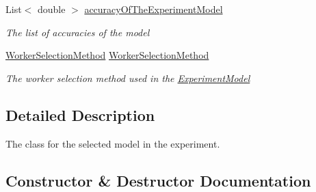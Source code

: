 \begin{DoxyCompactItemize}
List$<$ double $>$ \hyperlink{class_acrive_crowd_g_u_i_1_1_experiment_model_ada76d7308ef6cea72a9e330dbb8609d7}{accuracy\+Of\+The\+Experiment\+Model}
\begin{DoxyCompactList}\small\item\em The list of accuracies of the model \end{DoxyCompactList}\item 
\hyperlink{namespace_crowdsourcing_models_a1f0e849dc0691caa8fda0ce7778756a6}{Worker\+Selection\+Method} \hyperlink{class_acrive_crowd_g_u_i_1_1_experiment_model_ac16067088de0e358eca610efad0fba17}{Worker\+Selection\+Method}
\begin{DoxyCompactList}\small\item\em The worker selection method used in the \hyperlink{class_acrive_crowd_g_u_i_1_1_experiment_model}{Experiment\+Model} \end{DoxyCompactList}\end{DoxyCompactItemize}


\subsection{Detailed Description}
The class for the selected model in the experiment. 



\subsection{Constructor \& Destructor Documentation}
\hypertarget{class_acrive_crowd_g_u_i_1_1_experiment_model_a6a123911e50acef2040b3769458e8e9c}{}
